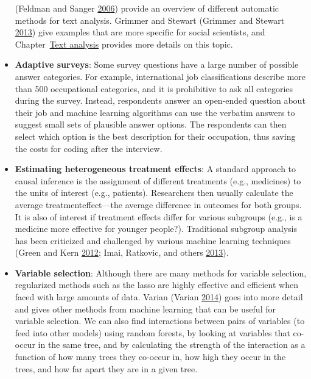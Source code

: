 \documentclass[]{krantz}
\begin{document}
\begin{itemize}
  (Feldman and Sanger \protect\hyperlink{ref-FeldmanSanger}{2006})
  provide an overview of different automatic methods for text analysis.
  Grimmer and Stewart (Grimmer and Stewart
  \protect\hyperlink{ref-grimmer2013text}{2013}) give examples that are
  more specific for social scientists, and
  Chapter~\protect\hyperlink{chap:text}{Text analysis} provides more
  details on this topic.
\item
  \textbf{Adaptive surveys}: Some survey questions have a large number
  of possible answer categories. For example, international job
  classifications describe more than 500 occupational categories, and it
  is prohibitive to ask all categories during the survey. Instead,
  respondents answer an open-ended question about their job and machine
  learning algorithms can use the verbatim answers to suggest small sets
  of plausible answer options. The respondents can then select which
  option is the best description for their occupation, thus saving the
  costs for coding after the interview.
\item
  \textbf{Estimating heterogeneous treatment effects}: A standard
  approach to causal inference is the assignment of different treatments
  (e.g., medicines) to the units of interest (e.g., patients).
  Researchers then usually calculate the average treatmenteffect---the
  average difference in outcomes for both groups. It is also of interest
  if treatment effects differ for various subgroups (e.g., is a medicine
  more effective for younger people?). Traditional subgroup analysis has
  been criticized and challenged by various machine learning techniques
  (Green and Kern \protect\hyperlink{ref-green2012modeling}{2012}; Imai,
  Ratkovic, and others
  \protect\hyperlink{ref-imai2013estimating}{2013}).
\item
  \textbf{Variable selection}: Although there are many methods for
  variable selection, regularized methods such as the lasso are highly
  effective and efficient when faced with large amounts of data. Varian
  (Varian \protect\hyperlink{ref-Varian2014}{2014}) goes into more
  detail and gives other methods from machine learning that can be
  useful for variable selection. We can also find interactions between
  pairs of variables (to feed into other models) using random forests,
  by looking at variables that co-occur in the same tree, and by
  calculating the strength of the interaction as a function of how many
  trees they co-occur in, how high they occur in the trees, and how far
  apart they are in a given tree.
\end{itemize}
\end{document}
